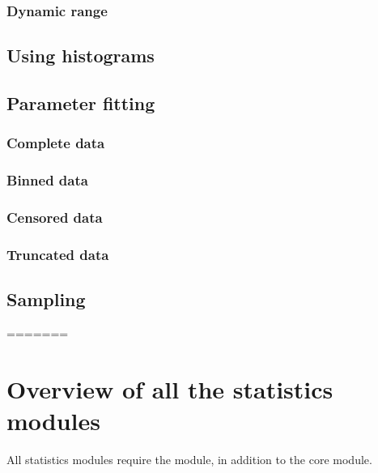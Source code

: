 \subsubsection{Dynamic range}


\subsection{Using histograms}

\subsection{Parameter fitting}
\subsubsection{Complete data}
\subsubsection{Binned data}
\subsubsection{Censored data}
\subsubsection{Truncated data}



\subsection{Sampling}







=======

\section{Overview of all the statistics modules}

All statistics modules require the  module, in addition
to the core  module.


